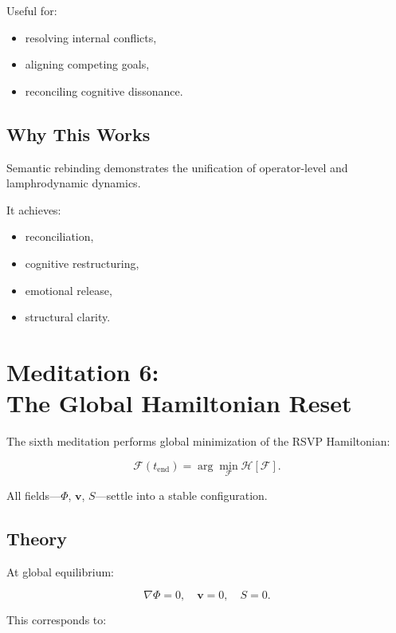 \documentclass[12pt]{article}
\begin{document}
Useful for:

\begin{itemize}
    \item resolving internal conflicts,
    \item aligning competing goals,
    \item reconciling cognitive dissonance.
\end{itemize}

\section{Why This Works}

Semantic rebinding demonstrates the unification of operator-level and
lamphrodynamic dynamics.

It achieves:

\begin{itemize}
    \item reconciliation,
    \item cognitive restructuring,
    \item emotional release,
    \item structural clarity.
\end{itemize}

\newpage


\chapter{Meditation 6:\\ The Global Hamiltonian Reset}

The sixth meditation performs global minimization of the RSVP Hamiltonian:

\[
\mathcal{F}(t_{\mathrm{end}}) = \arg\min_{\mathcal{F}} \mathcal{H}[\mathcal{F}].
\]

All fields---$\Phi$, $\mathbf{v}$, $S$---settle into a stable configuration.

\section{Theory}

At global equilibrium:

\[
\nabla\Phi = 0,
\quad
\mathbf{v} = 0,
\quad
S = 0.
\]

This corresponds to:
\end{document}
